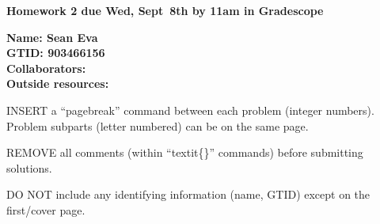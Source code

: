 \documentclass[11pt]{article}
\begin{document}
{\noindent\Large\textbf{Homework 2 due Wed, Sept~8th by 11am in Gradescope}}

\vspace{.25in}

{\large
\noindent
\textbf{Name: Sean Eva} \smallskip \\
\textbf{GTID: 903466156} \smallskip \\
\textbf{Collaborators:} \smallskip \\
\textbf{Outside resources:} \smallskip
}

\pagebreak 


INSERT a ``pagebreak'' command between each problem (integer numbers).
Problem subparts (letter numbered) can be on the same page.

REMOVE all comments (within ``textit\{\}'' commands) before submitting
solutions.

DO NOT include any identifying information (name, GTID) except on the
first/cover page.
\end{document}
